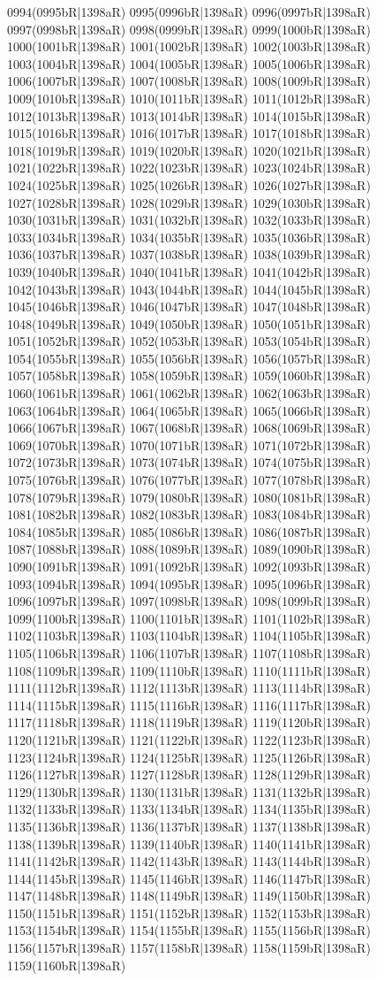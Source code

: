 0994(0995bR|1398aR) 0995(0996bR|1398aR) 0996(0997bR|1398aR) 0997(0998bR|1398aR) 0998(0999bR|1398aR) 0999(1000bR|1398aR) 1000(1001bR|1398aR) 1001(1002bR|1398aR) 1002(1003bR|1398aR) 1003(1004bR|1398aR) 1004(1005bR|1398aR) 1005(1006bR|1398aR) 1006(1007bR|1398aR) 1007(1008bR|1398aR) 1008(1009bR|1398aR) 1009(1010bR|1398aR) 1010(1011bR|1398aR) 1011(1012bR|1398aR) 1012(1013bR|1398aR) 1013(1014bR|1398aR) 1014(1015bR|1398aR) 1015(1016bR|1398aR) 1016(1017bR|1398aR) 1017(1018bR|1398aR) 1018(1019bR|1398aR) 1019(1020bR|1398aR) 1020(1021bR|1398aR) 1021(1022bR|1398aR) 1022(1023bR|1398aR) 1023(1024bR|1398aR) 1024(1025bR|1398aR) 1025(1026bR|1398aR) 1026(1027bR|1398aR) 1027(1028bR|1398aR) 1028(1029bR|1398aR) 1029(1030bR|1398aR) 1030(1031bR|1398aR) 1031(1032bR|1398aR) 1032(1033bR|1398aR) 1033(1034bR|1398aR) 1034(1035bR|1398aR) 1035(1036bR|1398aR) 1036(1037bR|1398aR) 1037(1038bR|1398aR) 1038(1039bR|1398aR) 1039(1040bR|1398aR) 1040(1041bR|1398aR) 1041(1042bR|1398aR) 1042(1043bR|1398aR) 1043(1044bR|1398aR) 1044(1045bR|1398aR) 1045(1046bR|1398aR) 1046(1047bR|1398aR) 1047(1048bR|1398aR) 1048(1049bR|1398aR) 1049(1050bR|1398aR) 1050(1051bR|1398aR) 1051(1052bR|1398aR) 1052(1053bR|1398aR) 1053(1054bR|1398aR) 1054(1055bR|1398aR) 1055(1056bR|1398aR) 1056(1057bR|1398aR) 1057(1058bR|1398aR) 1058(1059bR|1398aR) 1059(1060bR|1398aR) 1060(1061bR|1398aR) 1061(1062bR|1398aR) 1062(1063bR|1398aR) 1063(1064bR|1398aR) 1064(1065bR|1398aR) 1065(1066bR|1398aR) 1066(1067bR|1398aR) 1067(1068bR|1398aR) 1068(1069bR|1398aR) 1069(1070bR|1398aR) 1070(1071bR|1398aR) 1071(1072bR|1398aR) 1072(1073bR|1398aR) 1073(1074bR|1398aR) 1074(1075bR|1398aR) 1075(1076bR|1398aR) 1076(1077bR|1398aR) 1077(1078bR|1398aR) 1078(1079bR|1398aR) 1079(1080bR|1398aR) 1080(1081bR|1398aR) 1081(1082bR|1398aR) 1082(1083bR|1398aR) 1083(1084bR|1398aR) 1084(1085bR|1398aR) 1085(1086bR|1398aR) 1086(1087bR|1398aR) 1087(1088bR|1398aR) 1088(1089bR|1398aR) 1089(1090bR|1398aR) 1090(1091bR|1398aR) 1091(1092bR|1398aR) 1092(1093bR|1398aR) 1093(1094bR|1398aR) 1094(1095bR|1398aR) 1095(1096bR|1398aR) 1096(1097bR|1398aR) 1097(1098bR|1398aR) 1098(1099bR|1398aR) 1099(1100bR|1398aR) 1100(1101bR|1398aR) 1101(1102bR|1398aR) 1102(1103bR|1398aR) 1103(1104bR|1398aR) 1104(1105bR|1398aR) 1105(1106bR|1398aR) 1106(1107bR|1398aR) 1107(1108bR|1398aR) 1108(1109bR|1398aR) 1109(1110bR|1398aR) 1110(1111bR|1398aR) 1111(1112bR|1398aR) 1112(1113bR|1398aR) 1113(1114bR|1398aR) 1114(1115bR|1398aR) 1115(1116bR|1398aR) 1116(1117bR|1398aR) 1117(1118bR|1398aR) 1118(1119bR|1398aR) 1119(1120bR|1398aR) 1120(1121bR|1398aR) 1121(1122bR|1398aR) 1122(1123bR|1398aR) 1123(1124bR|1398aR) 1124(1125bR|1398aR) 1125(1126bR|1398aR) 1126(1127bR|1398aR) 1127(1128bR|1398aR) 1128(1129bR|1398aR) 1129(1130bR|1398aR) 1130(1131bR|1398aR) 1131(1132bR|1398aR) 1132(1133bR|1398aR) 1133(1134bR|1398aR) 1134(1135bR|1398aR) 1135(1136bR|1398aR) 1136(1137bR|1398aR) 1137(1138bR|1398aR) 1138(1139bR|1398aR) 1139(1140bR|1398aR) 1140(1141bR|1398aR) 1141(1142bR|1398aR) 1142(1143bR|1398aR) 1143(1144bR|1398aR) 1144(1145bR|1398aR) 1145(1146bR|1398aR) 1146(1147bR|1398aR) 1147(1148bR|1398aR) 1148(1149bR|1398aR) 1149(1150bR|1398aR) 1150(1151bR|1398aR) 1151(1152bR|1398aR) 1152(1153bR|1398aR) 1153(1154bR|1398aR) 1154(1155bR|1398aR) 1155(1156bR|1398aR) 1156(1157bR|1398aR) 1157(1158bR|1398aR) 1158(1159bR|1398aR) 1159(1160bR|1398aR) 